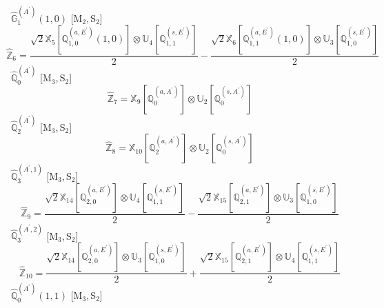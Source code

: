 \documentclass[fleqn,10pt,landscape]{article}
\begin{document}
\begin{itemize}
\begin{dmath*}
\end{dmath*}
\vspace{4mm}
\noindent {} $\,\,\,\hat{\mathbb{G}}_{1}^{(A^{\prime})}(1,0)$ [M$_{2}$,\,S$_{2}$]
\begin{dmath*}
\hat{\mathbb{Z}}_{6}=\frac{\sqrt{2} \mathbb{X}_{5}[\mathbb{Q}_{1,0}^{(a,E^{\prime})}(1,0)] \otimes\mathbb{U}_{4}[\mathbb{Q}_{1,1}^{(s,E^{\prime})}]}{2} - \frac{\sqrt{2} \mathbb{X}_{6}[\mathbb{Q}_{1,1}^{(a,E^{\prime})}(1,0)] \otimes\mathbb{U}_{3}[\mathbb{Q}_{1,0}^{(s,E^{\prime})}]}{2}
\end{dmath*}
\vspace{4mm}
\noindent {} $\,\,\,\hat{\mathbb{Q}}_{0}^{(A^{\prime})}$ [M$_{3}$,\,S$_{2}$]
\begin{dmath*}
\hat{\mathbb{Z}}_{7}=\mathbb{X}_{9}[\mathbb{Q}_{0}^{(a,A^{\prime})}] \otimes\mathbb{U}_{2}[\mathbb{Q}_{0}^{(s,A^{\prime})}]
\end{dmath*}
\vspace{4mm}
\noindent {} $\,\,\,\hat{\mathbb{Q}}_{2}^{(A^{\prime})}$ [M$_{3}$,\,S$_{2}$]
\begin{dmath*}
\hat{\mathbb{Z}}_{8}=\mathbb{X}_{10}[\mathbb{Q}_{2}^{(a,A^{\prime})}] \otimes\mathbb{U}_{2}[\mathbb{Q}_{0}^{(s,A^{\prime})}]
\end{dmath*}
\vspace{4mm}
\noindent {} $\,\,\,\hat{\mathbb{Q}}_{3}^{(A^{\prime},1)}$ [M$_{3}$,\,S$_{2}$]
\begin{dmath*}
\hat{\mathbb{Z}}_{9}=\frac{\sqrt{2} \mathbb{X}_{14}[\mathbb{Q}_{2,0}^{(a,E^{\prime})}] \otimes\mathbb{U}_{4}[\mathbb{Q}_{1,1}^{(s,E^{\prime})}]}{2} - \frac{\sqrt{2} \mathbb{X}_{15}[\mathbb{Q}_{2,1}^{(a,E^{\prime})}] \otimes\mathbb{U}_{3}[\mathbb{Q}_{1,0}^{(s,E^{\prime})}]}{2}
\end{dmath*}
\vspace{4mm}
\noindent {} $\,\,\,\hat{\mathbb{Q}}_{3}^{(A^{\prime},2)}$ [M$_{3}$,\,S$_{2}$]
\begin{dmath*}
\hat{\mathbb{Z}}_{10}=\frac{\sqrt{2} \mathbb{X}_{14}[\mathbb{Q}_{2,0}^{(a,E^{\prime})}] \otimes\mathbb{U}_{3}[\mathbb{Q}_{1,0}^{(s,E^{\prime})}]}{2} + \frac{\sqrt{2} \mathbb{X}_{15}[\mathbb{Q}_{2,1}^{(a,E^{\prime})}] \otimes\mathbb{U}_{4}[\mathbb{Q}_{1,1}^{(s,E^{\prime})}]}{2}
\end{dmath*}
\vspace{4mm}
\noindent {} $\,\,\,\hat{\mathbb{Q}}_{0}^{(A^{\prime})}(1,1)$ [M$_{3}$,\,S$_{2}$]
\begin{dmath*}

\end{dmath*}
\end{itemize}
\end{document}
